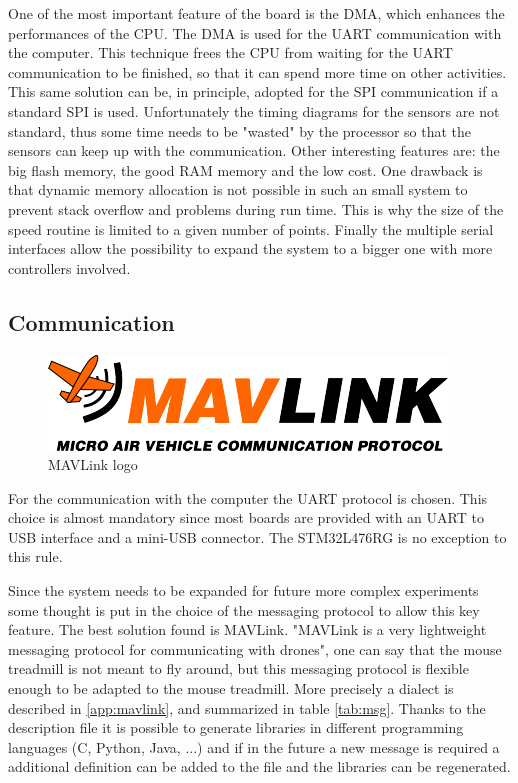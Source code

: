 \documentclass[12pt,a4paper]{article}
\begin{document}
One of the most important feature of the board is the DMA, which enhances the performances of the CPU. The DMA is used for the UART communication with the computer. This technique frees the CPU from waiting for the UART communication to be finished, so that it can spend more time on other activities. This same solution can be, in principle, adopted for the SPI communication if a standard SPI is used. Unfortunately the timing diagrams for the sensors are not standard, thus some time needs to be "wasted" by the processor so that the sensors can keep up with the communication.
Other interesting features are: the big flash memory, the good RAM memory and the low cost. One drawback is that dynamic memory allocation is not possible in such an small system to prevent stack overflow and problems during run time. This is why the size of the speed routine is limited to a given number of points.
Finally the multiple serial interfaces allow the possibility to expand the system to a bigger one with more controllers involved.

\subsection{Communication}
\begin{figure}
	\includegraphics[width=\linewidth]{fig/MAVLink_logo.png}
	\caption{MAVLink logo}\label{fig:MAVLink_logo}
\end{figure}
For the communication with the computer the UART protocol is chosen. This choice is almost mandatory since most boards are provided with an UART to USB interface and a mini-USB connector. The STM32L476RG is no exception to this rule.

Since the system needs to be expanded for future more complex experiments some thought is put in the choice of the messaging protocol to allow this key feature.
The best solution found is MAVLink. "MAVLink is a very lightweight messaging protocol for communicating with drones"\cite{mavlink}, one can say that the mouse treadmill is not meant to fly around, but this messaging protocol is flexible enough to be adapted to the mouse treadmill.
More precisely a dialect is described in \ref{app:mavlink}, and summarized in table \ref{tab:msg}. Thanks to the description file it is possible to generate libraries in different programming languages (C, Python, Java, ...) and if in the future a new message is required a additional definition can be added to the file and the libraries can be regenerated.
\end{document}
